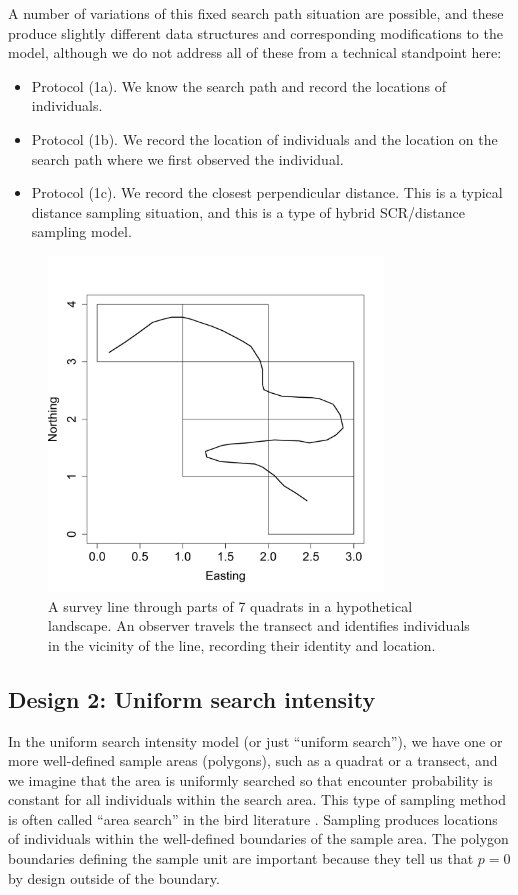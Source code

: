 A number of variations of this fixed search path situation are
possible, and these produce slightly different data structures and
corresponding modifications to the model, although we do not address
all of these from a technical standpoint here:
\begin{itemize}
 \item[] Protocol (1a). We know the search path and record the
   locations of individuals.
 \item[] Protocol (1b). We record the location of individuals and
   the location on the search path where we first observed the individual.
 \item[] Protocol (1c). We record
the closest perpendicular distance. This is a typical
   distance sampling situation, and this is a type of hybrid
   SCR/distance sampling model.
 \end{itemize}

\begin{figure}
\centering
\includegraphics[width=3.5in,height=3.5in]{Ch15-searchencounter/figs/snakeline.png}
\caption{
A survey line through parts of 7 quadrats in a
  hypothetical landscape. An observer travels the transect and
  identifies individuals in the vicinity of the line, recording their
  identity and location.
}
\label{searchencounter.fig.snakeline}
\end{figure}


\subsection{Design 2: Uniform search intensity}

In the uniform search intensity model (or just ``uniform search''), we
have one or more well-defined sample areas (polygons), such as a
quadrat or a transect, and we imagine that the area is uniformly
searched so that encounter probability is constant for all individuals
within the search area.  This type of sampling method is often called
``area search'' in the bird literature \citep{bibby_etal:1992}.
Sampling produces locations of individuals within the well-defined
boundaries of the sample area. The polygon boundaries defining the
sample unit are important because they tell us that $p=0$ by design
outside of the boundary.

